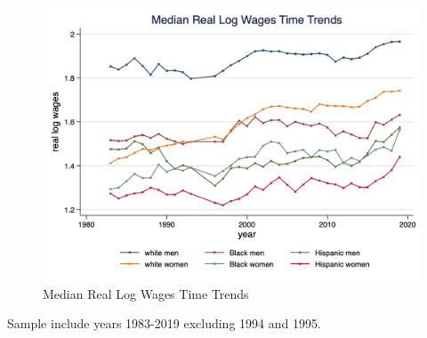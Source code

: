 \documentclass[11pt]{article}
\begin{document}
{\pagebreak
\begin{figure}[h!]
\centering
    \caption{Median Real Log Wages Time Trends}\label{fig:med_wage_time}
    \includegraphics[width=\textwidth, height = 0.8\textheight, keepaspectratio]{figures/fin_med_wage_time.png}
\end{figure}
\footnotesize{Sample include years 1983-2019 excluding 1994 and 1995.}

}
\end{document}
